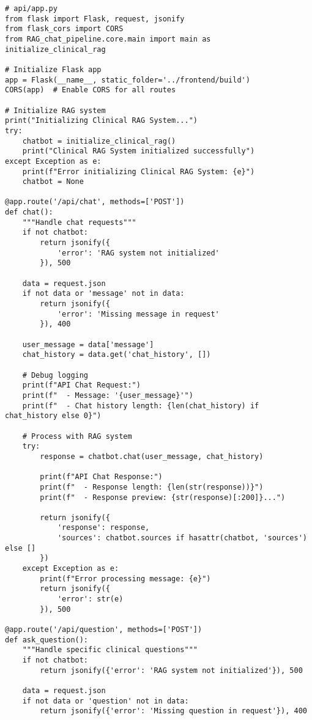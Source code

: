 \begin{verbatim}
# api/app.py
from flask import Flask, request, jsonify
from flask_cors import CORS
from RAG_chat_pipeline.core.main import main as initialize_clinical_rag

# Initialize Flask app
app = Flask(__name__, static_folder='../frontend/build')
CORS(app)  # Enable CORS for all routes

# Initialize RAG system
print("Initializing Clinical RAG System...")
try:
    chatbot = initialize_clinical_rag()
    print("Clinical RAG System initialized successfully")
except Exception as e:
    print(f"Error initializing Clinical RAG System: {e}")
    chatbot = None

@app.route('/api/chat', methods=['POST'])
def chat():
    """Handle chat requests"""
    if not chatbot:
        return jsonify({
            'error': 'RAG system not initialized'
        }), 500

    data = request.json
    if not data or 'message' not in data:
        return jsonify({
            'error': 'Missing message in request'
        }), 400

    user_message = data['message']
    chat_history = data.get('chat_history', [])

    # Debug logging
    print(f"API Chat Request:")
    print(f"  - Message: '{user_message}'")
    print(f"  - Chat history length: {len(chat_history) if chat_history else 0}")

    # Process with RAG system
    try:
        response = chatbot.chat(user_message, chat_history)
        
        print(f"API Chat Response:")
        print(f"  - Response length: {len(str(response))}")
        print(f"  - Response preview: {str(response)[:200]}...")

        return jsonify({
            'response': response,
            'sources': chatbot.sources if hasattr(chatbot, 'sources') else []
        })
    except Exception as e:
        print(f"Error processing message: {e}")
        return jsonify({
            'error': str(e)
        }), 500

@app.route('/api/question', methods=['POST'])
def ask_question():
    """Handle specific clinical questions"""
    if not chatbot:
        return jsonify({'error': 'RAG system not initialized'}), 500

    data = request.json
    if not data or 'question' not in data:
        return jsonify({'error': 'Missing question in request'}), 400


\end{verbatim}
